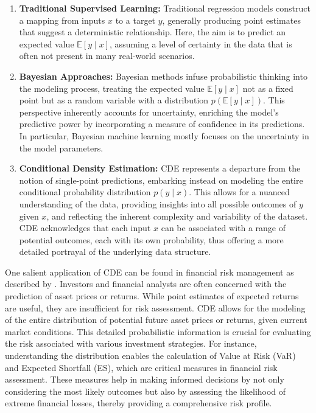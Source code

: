 \documentclass{article}
\begin{document}
\begin{enumerate}
   \item \textbf{Traditional Supervised Learning:} 
   Traditional regression models construct a mapping from inputs \( x \) to a target \( y \), generally producing point estimates that suggest a deterministic relationship. Here, the aim is to predict an expected value \( \mathbb{E}[y \mid x] \), assuming a level of certainty in the data that is often not present in many real-world scenarios.

   \item \textbf{Bayesian Approaches:} 
   Bayesian methods infuse probabilistic thinking into the modeling process, treating the expected value \( \mathbb{E}[y \mid x] \) not as a fixed point but as a random variable with a distribution \( p(\mathbb{E}[y \mid x]) \). This perspective inherently accounts for uncertainty, enriching the model's predictive power by incorporating a measure of confidence in its predictions. In particular, Bayesian machine learning mostly focuses on the uncertainty in the model parameters.

   \item \textbf{Conditional Density Estimation:} 
   CDE represents a departure from the notion of single-point predictions, embarking instead on modeling the entire conditional probability distribution \( p(y \mid x) \). This allows for a nuanced understanding of the data, providing insights into all possible outcomes of \( y \) given \( x \), and reflecting the inherent complexity and variability of the dataset. CDE acknowledges that each input \( x \) can be associated with a range of potential outcomes, each with its own probability, thus offering a more detailed portrayal of the underlying data structure.
\end{enumerate}
One salient application of CDE can be found in financial risk management as described by \citep{mcneil2015quantitative}. Investors and financial analysts are often concerned with the prediction of asset prices or returns. While point estimates of expected returns are useful, they are insufficient for risk assessment. CDE allows for the modeling of the entire distribution of potential future asset prices or returns, given current market conditions. This detailed probabilistic information is crucial for evaluating the risk associated with various investment strategies. For instance, understanding the distribution enables the calculation of Value at Risk (VaR) and Expected Shortfall (ES), which are critical measures in financial risk assessment. These measures help in making informed decisions by not only considering the most likely outcomes but also by assessing the likelihood of extreme financial losses, thereby providing a comprehensive risk profile.
\end{document}
